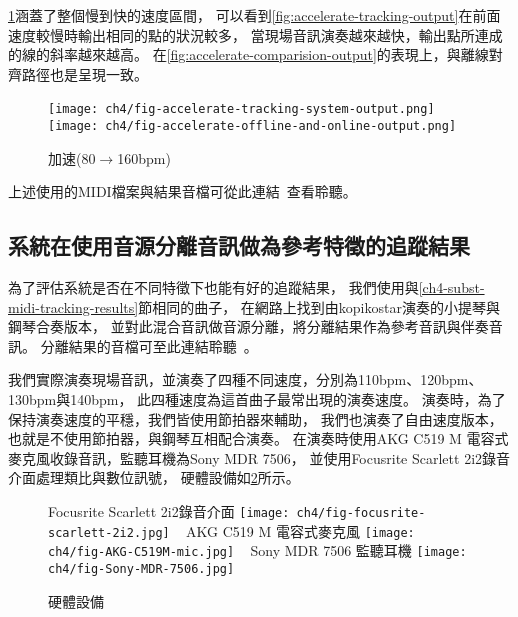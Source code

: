 \documentclass[class=NCU_thesis, crop=false]{standalone}
\begin{document}
\cref{fig:fig-ch4-accelerate-tracking-results}涵蓋了整個慢到快的速度區間，
可以看到\cref{fig:accelerate-tracking-output}在前面速度較慢時輸出相同的點的狀況較多，
當現場音訊演奏越來越快，輸出點所連成的線的斜率越來越高。
在\cref{fig:accelerate-comparision-output}的表現上，與離線對齊路徑也是呈現一致。

\begin{figure}[H]
    \centering
    \subcaptionbox
    {
    \label{fig:accelerate-tracking-output}}
    {\texttt{[image: ch4/fig-accelerate-tracking-system-output.png]}}
    ~
    \subcaptionbox
    {
    \label{fig:accelerate-comparision-output}}
    {\texttt{[image: ch4/fig-accelerate-offline-and-online-output.png]}}
    \caption{加速(80$ \rightarrow $160bpm)}
    \label{fig:fig-ch4-accelerate-tracking-results}
\end{figure}

上述使用的MIDI檔案與結果音檔可從此連結~\cite{YuJieLin2024MidiTrackingResults}查看聆聽。


\subsection{系統在使用音源分離音訊做為參考特徵的追蹤結果}
為了評估系統是否在不同特徵下也能有好的追蹤結果，
我們使用與\ref{ch4-subst-midi-tracking-results}節相同的曲子，
在網路上找到由kopikostar演奏的小提琴與鋼琴合奏版本\cite{kopikostar2024Beethoven}，
並對此混合音訊做音源分離，將分離結果作為參考音訊與伴奏音訊。
分離結果的音檔可至此連結聆聽~\cite{YuJieLin2024MusicSourceSeparation}。

我們實際演奏現場音訊，並演奏了四種不同速度，分別為110bpm、120bpm、130bpm與140bpm，
此四種速度為這首曲子最常出現的演奏速度。
演奏時，為了保持演奏速度的平穩，我們皆使用節拍器來輔助，
我們也演奏了自由速度版本，也就是不使用節拍器，與鋼琴互相配合演奏。
在演奏時使用AKG C519 M 電容式麥克風收錄音訊，監聽耳機為Sony MDR 7506，
並使用Focusrite Scarlett 2i2錄音介面處理類比與數位訊號，
硬體設備如\cref{fig:fig-ch4-hardware-device}所示。
\begin{figure}[H]
    \centering
    \subcaptionbox
    {Focusrite Scarlett 2i2錄音介面
    \label{fig:fig-focusrite-scarlett-2i2}}
    {\texttt{[image: ch4/fig-focusrite-scarlett-2i2.jpg]}}
    ~
    \subcaptionbox
    {AKG C519 M 電容式麥克風
    \label{fig:fig-AKG-C519M-mic}}
    {\texttt{[image: ch4/fig-AKG-C519M-mic.jpg]}}
    ~
    \subcaptionbox
    {Sony MDR 7506 監聽耳機
    \label{fig:fig-Sony-MDR-7506}}
    {\texttt{[image: ch4/fig-Sony-MDR-7506.jpg]}}
    \caption{硬體設備}
    \label{fig:fig-ch4-hardware-device}
\end{figure}
\end{document}
